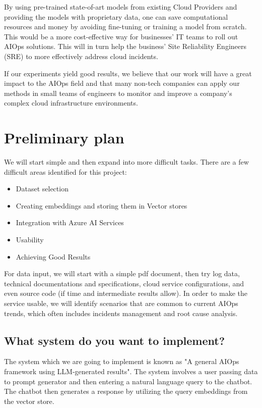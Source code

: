 \documentclass[conference]{IEEEtran}
\begin{document}
By using pre-trained state-of-art models from existing Cloud Providers and providing the models with proprietary data, one can save computational resources and money by avoiding fine-tuning or training a model from scratch. This would be a more cost-effective way for businesses' IT teams to roll out AIOps solutions. This will in turn help the business' Site Reliability Engineers (SRE) to more effectively address cloud incidents.

If our experiments yield good results, we believe that our work will have a great impact to the AIOps field and that many non-tech companies can apply our methods in small teams of engineers to monitor and improve a company's complex cloud infrastructure environments.

\section{Preliminary plan}
We will start simple and then expand into more difficult tasks.
There are a few difficult areas identified for this project:
\begin{itemize}
    \item Dataset selection
    \item Creating embeddings and storing them in Vector stores
    \item Integration with Azure AI Services
    \item Usability
    \item Achieving Good Results
\end{itemize}
For data input, we will start with a simple pdf document, then try log data, technical documentations and specifications, cloud service configurations, and even source code (if time and intermediate results allow).
In order to make the service usable, we will identify scenarios that are common to current AIOps trends, which often includes incidents management and root cause analysis.

\subsection{What system do you want to implement?}\label{AA}
The system which we are going to implement is known as "A general AIOps framework using LLM-generated results". The system involves a user passing data to prompt generator and then entering a natural language query to the chatbot. The chatbot then generates a response by utilizing the query embeddings from the vector store.
\end{document}
